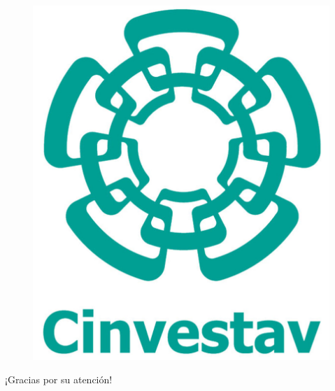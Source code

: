 \documentclass{beamer}
\begin{document}
\begin{frame}

\begin{figure}[htpb]
        \begin{center}
            \includegraphics[width=0.15\linewidth]{Cinvestav.jpg}
        \end{center}
    \end{figure}
   
    \begin{center}
        {\Huge\calligra ¡Gracias por su atención! }
    \end{center}
   
\end{frame}
\end{document}
